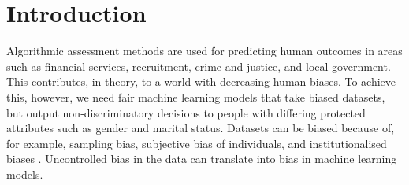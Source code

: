 


\section{Introduction}
Algorithmic assessment methods are used for predicting human outcomes in areas such as financial services, recruitment, crime and justice, and local government.
This contributes, in theory, to a world with decreasing human biases.
To achieve this, however, we need fair machine learning models that take biased datasets,
but output non-discriminatory decisions to people with differing protected attributes such as gender and marital status.
Datasets can be biased because of, for example, sampling bias, subjective bias of individuals, and institutionalised biases \citep{OltCasDiaKic19,Tol19}.
Uncontrolled bias in the data can translate into bias in machine learning models.

